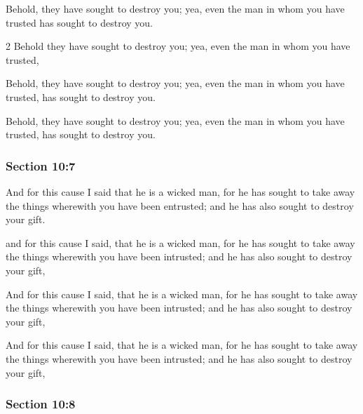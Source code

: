 		Behold, they have sought to destroy you; yea, even the man in whom you have trusted has sought to destroy you.

		\begin{framed}
		\scriptsize
			\begin{compactdesc}
				\item[JSP] 2 Behold they have sought to destroy you; yea, even the man in whom you have trusted,
				\item[RB1] [\textit{missing}] 
				\item[DC 1835] Behold, they have sought to destroy you; yea, even the man in whom you have trusted, has sought to destroy you.
				\item[DC 1844] Behold, they have sought to destroy you; yea, even the man in whom you have trusted, has sought to destroy you.
			\end{compactdesc}
		\end{framed}

	\subsubsection{Section 10:7} %
		\label{DC10-7}

		And for this cause I said that he is a wicked man, for he has sought to take away the things wherewith you have been entrusted; and he has also sought to destroy your gift.

		\begin{framed}
		\scriptsize
			\begin{compactdesc}
				\item[JSP] and for this cause I said, that he is a wicked man, for he has sought to take away the things wherewith you have been intrusted; and he has also sought to destroy your gift,
				\item[RB1] [\textit{missing}] 
				\item[DC 1835] And for this cause I said, that he is a wicked man, for he has sought to take away the things wherewith you have been intrusted; and he has also sought to destroy your gift,
				\item[DC 1844] And for this cause I said, that he is a wicked man, for he has sought to take away the things wherewith you have been intrusted; and he has also sought to destroy your gift,
			\end{compactdesc}
		\end{framed}

	\subsubsection{Section 10:8} %
		\label{DC10-8}

